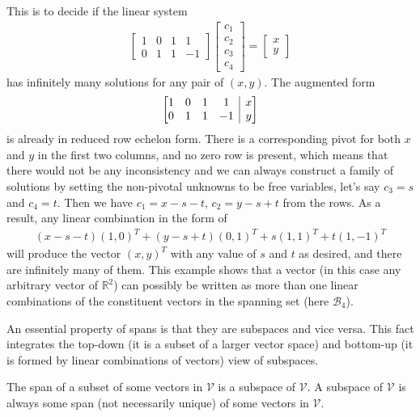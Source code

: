 \begin{solution}
This is to decide if the linear system
\begin{align*}
\begin{bmatrix}
1 & 0 & 1 & 1 \\
0 & 1 & 1 & -1
\end{bmatrix}
\begin{bmatrix}
c_1 \\
c_2 \\
c_3 \\
c_4
\end{bmatrix}
=
\begin{bmatrix}
x \\
y
\end{bmatrix}    
\end{align*}
has infinitely many solutions for any pair of $(x,y)$. The augmented form
\begin{align*}
\left[\begin{array}{@{}cccc|c@{}}
1 & 0 & 1 & 1 & x \\
0 & 1 & 1 & -1 & y
\end{array}\right]
\end{align*}
is already in reduced row echelon form. There is a corresponding pivot for both $x$ and $y$ in the first two columns, and no zero row is present, which means that there would not be any inconsistency and we can always construct a family of solutions by setting the non-pivotal unknowns to be free variables, let's say $c_3 = s$ and $c_4 = t$. Then we have $c_1 = x - s - t$, $c_2 = y - s + t$ from the rows. As a result, any linear combination in the form of
\begin{align*}
(x-s-t)(1,0)^T + (y-s+t)(0,1)^T + s(1,1)^T + t(1,-1)^T
\end{align*}
will produce the vector $(x,y)^T$ with any value of $s$ and $t$ as desired, and there are infinitely many of them. This example shows that a vector (in this case any arbitrary vector of $\mathbb{R}^2$) can possibly be written as more than one linear combinations of the constituent vectors in the spanning set (here $\mathcal{B}_4$).
\end{solution}
An essential property of spans is that they are subspaces and vice versa. This fact integrates the top-down (it is a subset of a larger vector space) and bottom-up (it is formed by linear combinations of vectors) view of subspaces.
\begin{proper}
\label{proper:subspace_n_span}
The span of a subset of some vectors in $\mathcal{V}$ is a subspace of $\mathcal{V}$. A subspace of $\mathcal{V}$ is always some span (not necessarily unique) of some vectors in $\mathcal{V}$.
\end{proper}
